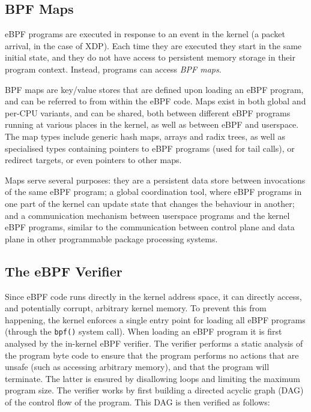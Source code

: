 \documentclass[sigconf]{acmart}
\begin{document}
\subsection{BPF Maps}
\label{sec:bpf-maps}
eBPF programs are executed in response to an event in the kernel (a packet
arrival, in the case of XDP). Each time they are executed they start in the same
initial state, and they do not have access to persistent memory storage in their
program context. Instead, programs can access \emph{BPF maps}.

BPF maps are key/value stores that are defined upon loading an eBPF program, and
can be referred to from within the eBPF code. Maps exist in both global and
per-CPU variants, and can be shared, both between different eBPF programs
running at various places in the kernel, as well as between eBPF and userspace.
The map types include generic hash maps, arrays and radix trees, as well as
specialised types containing pointers to eBPF programs (used for tail calls), or
redirect targets, or even pointers to other maps.

Maps serve several purposes: they are a persistent data store between
invocations of the same eBPF program; a global coordination tool, where eBPF
programs in one part of the kernel can update state that changes the behaviour
in another; and a communication mechanism between userspace programs and the
kernel eBPF programs, similar to the communication between control plane and
data plane in other programmable package processing systems.

\subsection{The eBPF Verifier}
\label{sec:bpf-verifier}
Since eBPF code runs directly in the kernel address space, it can directly
access, and potentially corrupt, arbitrary kernel memory. To prevent this from
happening, the kernel enforces a single entry point for loading all eBPF
programs (through the \texttt{bpf()} system call). When loading an eBPF program
it is first analysed by the in-kernel eBPF verifier. The verifier performs a
static analysis of the program byte code to ensure that the program performs no
actions that are unsafe (such as accessing arbitrary memory), and that the
program will terminate. The latter is ensured by disallowing loops and limiting
the maximum program size. The verifier works by first building a directed
acyclic graph (DAG) of the control flow of the program. This DAG is then
verified as follows:
\end{document}
